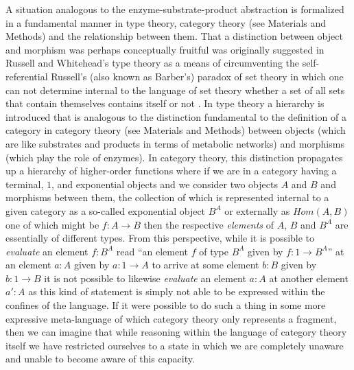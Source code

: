 A situation analogous to the enzyme-substrate-product abstraction  is formalized in a fundamental manner in type theory, category theory (see Materials and Methods) and the relationship between them. That a distinction between object and morphism was perhaps conceptually fruitful was originally suggested in Russell and Whitehead's type theory as a means of circumventing the self-referential Russell's (also known as Barber's) paradox of set theory in which one can not determine internal to the language of set theory whether a set of all sets that contain themselves contains itself or not \cite{Bell2012}. In type theory a hierarchy is introduced that is analogous to the distinction fundamental to the definition of a category in category theory (see Materials and Methods) between objects (which are like substrates and products in terms of metabolic networks) and morphisms (which play the role of enzymes). In category theory, this distinction propagates up a hierarchy of higher-order functions where if we are in a category having a terminal, $1$, and exponential objects and we consider two objects $A$ and $B$ and morphisms between them, the collection of which is represented internal to a given category as a so-called exponential object $B^A$ or externally as $Hom(A,B)$ one of which might be $f \colon A \rightarrow B$ then the respective \emph{elements} of $A$, $B$ and $B^A$ are essentially of different types. From this perspective, while it is possible to \emph{evaluate} an element $f:B^A$ read ``an element $f$ of type $B^A$ given by $f \colon 1 \rightarrow B^A$'' at an element $a:A$ given by $a \colon 1 \rightarrow A$ to arrive at some element $b:B$ given by $b \colon 1 \rightarrow B$ it is not possible to likewise \emph{evaluate} an element $a:A$ at another element $a':A$ as this kind of statement is simply not able to be expressed within the confines of the language. If it were possible to do such a thing in some more expressive meta-language of which category theory only represents a fragment, then we can imagine that while reasoning within the language of category theory itself we have restricted ourselves to a state in which we are completely unaware and unable to become aware of this capacity.

